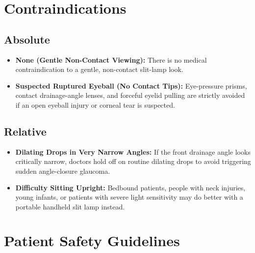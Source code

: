 \section{Contraindications}

\subsection{Absolute}

\begin{itemize}
    \item \textbf{None (Gentle Non-Contact Viewing):} There is no medical contraindication to a gentle, non-contact slit-lamp look.
    \item \textbf{Suspected Ruptured Eyeball (No Contact Tips):} Eye-pressure prisms, contact drainage-angle lenses, and forceful eyelid pulling are strictly avoided if an open eyeball injury or corneal tear is suspected.
\end{itemize}

\subsection{Relative}

\begin{itemize}
    \item \textbf{Dilating Drops in Very Narrow Angles:} If the front drainage angle looks critically narrow, doctors hold off on routine dilating drops to avoid triggering sudden angle-closure glaucoma.
    \item \textbf{Difficulty Sitting Upright:} Bedbound patients, people with neck injuries, young infants, or patients with severe light sensitivity may do better with a portable handheld slit lamp instead.
\end{itemize}

\section{Patient Safety Guidelines}

